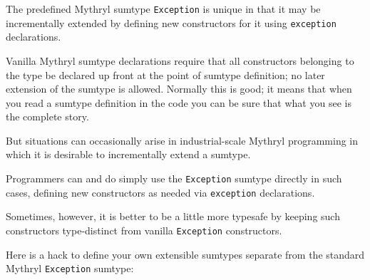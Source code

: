 The predefined Mythryl sumtype {\tt Exception} is unique in that it may 
be incrementally extended by defining new constructors for it using 
{\tt exception} declarations.

Vanilla Mythryl sumtype declarations require that all constructors belonging 
to the type be declared up front at the point of sumtype definition;  no later 
extension of the sumtype is allowed.  Normally this is good;  it means that 
when you read a sumtype definition in the code you can be sure that what 
you see is the complete story.

But situations can occasionally arise in industrial-scale Mythryl programming in 
which it is desirable to incrementally extend a sumtype.

Programmers can and do simply use the {\tt Exception} sumtype directly in 
such cases, defining new constructors as needed via {\tt exception} 
declarations.

Sometimes, however, it is better to be a little more typesafe by 
keeping such constructors type-distinct from vanilla {\tt Exception} 
constructors.

Here is a hack to define your own extensible sumtypes separate from 
the standard Mythryl {\tt Exception} sumtype:

